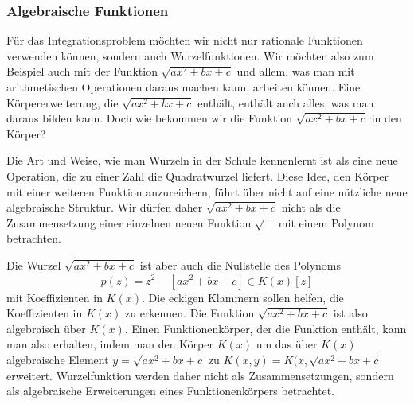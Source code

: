 \subsubsection{Algebraische Funktionen}
Für das Integrationsproblem möchten wir nicht nur rationale Funktionen
verwenden können, sondern auch Wurzelfunktionen.
Wir möchten also zum Beispiel auch mit der Funktion $\sqrt{ax^2+bx+c}$
und allem, was man mit arithmetischen Operationen daraus machen kann,
arbeiten können.
Eine Körpererweiterung, die $\sqrt{ax^2+bx+c}$ enthält, enthält auch
alles, was man daraus bilden kann.
Doch wie bekommen wir die Funktion $\sqrt{ax^2+bx+c}$ in den Körper?

Die Art und Weise, wie man Wurzeln in der Schule kennenlernt ist als
eine neue Operation, die zu einer Zahl die Quadratwurzel liefert.
Diese Idee, den Körper mit einer weiteren Funktion anzureichern,
führt über nicht auf eine nützliche neue algebraische Struktur.
Wir dürfen daher $\sqrt{ax^2+bx+c}$ nicht als die Zusammensetzung
einer einzelnen neuen Funktion $\sqrt{\phantom{A}}$ mit
einem Polynom betrachten.

Die Wurzel $\sqrt{ax^2+bx+c}$ ist aber auch die Nullstelle des Polynoms
\[
p(z)
=
z^2 - [ax^2+bx+c]
\in
K(x)[z]
\]
mit Koeffizienten in $K(x)$.
Die eckigen Klammern sollen helfen, die Koeffizienten in $K(x)$
zu erkennen.
Die Funktion $\sqrt{ax^2+bx+c}$ ist also algebraisch über $K(x)$.
Einen Funktionenkörper, der die Funktion enthält, kann man also erhalten,
indem man den Körper $K(x)$ um das über $K(x)$ algebraische Element
$y=\sqrt{ax^2+bx+c}$ zu $K(x,y)=K(x,\sqrt{ax^2+bx+c}$ erweitert.
Wurzelfunktion werden daher nicht als Zusammensetzungen, sondern als
algebraische Erweiterungen eines Funktionenkörpers betrachtet.


